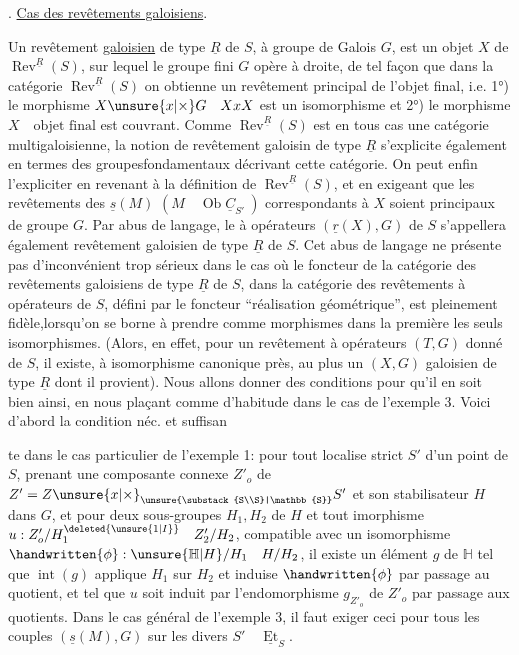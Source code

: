. \uline{Cas des revêtements galoisiens}.

Un revêtement \uline{galoisien} de type $\underline{R}$ de $S$, à groupe de Galois $G$, est un objet $X$ de $\operatorname{Rev}^{\underline{R}}(S)$, sur lequel le groupe fini $G$ opère à droite, de tel façon que dans la catégorie $\operatorname{Rev}^{\underline{R}}(S)$ on obtienne un revêtement principal de l'objet final, i.e. 1°) le morphisme $X\unsure{x|\times}G\quad XxX$ est un isomorphisme et 2°) le morphisme $X\quad\text{objet final}$ est couvrant. Comme $\operatorname{Rev}^{\underline{R}}(S)$ est en tous cas une catégorie multigaloisienne, la notion de revêtement galoisin de type $\underline{R}$ s'explicite également en termes des groupesfondamentaux décrivant cette catégorie. On peut enfin l'expliciter en revenant à la définition de $\operatorname{Rev}^{\underline{R}}(S)$, et en exigeant que les revêtements des $\underline{s}(M)$ $(M\quad\operatorname{Ob}\underline{C}_{S'}\ )$ correspondants à $X$ soient principaux de groupe $G$. Par abus de langage, le à opérateurs $(\underline{r}(X),G)$ de $S$ s'appellera également revêtement galoisien de type $\underline{R}$ de $S$. Cet abus de langage ne présente pas d'inconvénient trop sérieux dans le cas où le foncteur de la catégorie des revêtements galoisiens de type $\underline{R}$ de $S$, dans la catégorie des revêtements à opérateurs de $S$, défini par le foncteur ``réalisation géométrique'', est pleinement fidèle,lorsqu'on se borne à prendre comme morphismes dans la première les seuls isomorphismes. (Alors, en effet, pour un revêtement à opérateurs $(T,G)$ donné de $S$, il existe, à isomorphisme canonique près, au plus un $(X,G)$  galoisien de type $\underline{R}$ dont il provient). Nous allons donner des conditions pour qu'il en soit bien ainsi, en nous plaçant comme d'habitude dans le cas de l'exemple 3. Voici d'abord la condition néc. et suffisan

te dans le cas particulier de l'exemple 1: pour tout localise strict $S'$ d'un point de $S$, prenant une composante connexe $Z'_o$ de $Z'=Z\unsure{x|\times}_{\unsure{\substack{S\\S}|\mathbb{S}}}S'$ et son stabilisateur $H$ dans $G$, et pour deux sous-groupes  $H_1,H_2$ de $H$ et tout imorphisme $u:Z'_o/H_1^{\deleted{\unsure{1|I}}}\quad Z'_2/H_2$,  compatible avec un isomorphisme $\handwritten{\phi}:\unsure{\mathbb{H}|H}/H_1\quad H/H_2$, il existe un élément $g$ de $\mathbb{H}$ tel que $\operatorname{int}(g)$ applique $H_1$ sur $H_2$ et induise $\handwritten{\phi}$ par passage au quotient, et tel que $u$ soit induit par l'endomorphisme $g_{Z'_o}$ de $Z'_o$ par passage aux quotients. Dans le cas général de l'exemple 3, il faut exiger ceci pour tous les couples $(\underline{s}(M),G)$ sur les divers $S'\quad\underline{\operatorname{Et}}_S$.

